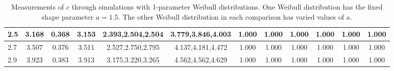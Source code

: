 \begin{table*}[h!]
\begin{center}
\begin{tabular}{| l | c | c | c | c | c | c | c | c | c | c | c |}
2.5 & 3.168 & 0.368 & 3.153 & 2.393,2.504,2.504 & 3.779,3.846,4.003  & 1.000  & 1.000  & 1.000  & 1.000  & 1.000  & 1.000 \\\hline
2.7 & 3.507 & 0.376 & 3.511 & 2.527,2.750,2.795 & 4.137,4.181,4.472  & 1.000  & 1.000  & 1.000  & 1.000  & 1.000  & 1.000 \\\hline
2.9 & 3.923 & 0.383 & 3.913 & 3.175,3.220,3.265 & 4.562,4.562,4.629  & 1.000  & 1.000  & 1.000  & 1.000  & 1.000  & 1.000 \\\hline
\end{tabular}
\caption{Measurements of $c$ through simulations
with 1-parameter Weibull distributions.
One Weibull distribution has the fixed shape parameter $a=1.5$.
The other Weibull distribution in each comparison
has varied values of $a$.}
\end{center}
\end{table*}